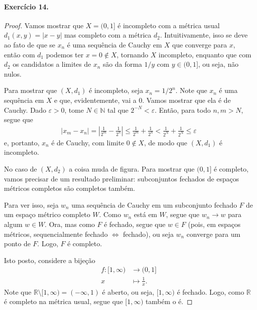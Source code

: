 \documentclass[12pt,a4paper]{article}
\begin{document}
\paragraph{Exercício 14.}
\begin{proof}
Vamos mostrar que $X = (0,1]$ é incompleto com a métrica usual $d_1(x,y) = |x-y|$ mas completo com a métrica $d_2$. Intuitivamente,
isso se deve ao fato de que se $x_n$ é uma sequência de Cauchy em $X$ que converge para $x$, então com $d_1$ podemos ter
$x=0\notin X$, tornando $X$ incompleto, enquanto que com $d_2$ os candidatos a limites de $x_n$ são da forma $1/y$ com $y\in (0,1]$, ou seja, não nulos.

Para mostrar que $(X, d_1)$ é incompleto, seja $x_n = 1/2^n$. Note que $x_n$ é uma sequência em $X$ e que, evidentemente, vai 
a $0$. Vamos mostrar que ela é de Cauchy. Dado $\varepsilon > 0$, tome $N\in\mathbb{N}$ tal que $2^{-N} < \varepsilon$. Então, para todo $n,m > N$, segue que
\begin{align*}
    |x_m - x_n| = \left| \frac{1}{2^m} - \frac{1}{2^n} \right| \leq \frac{1}{2^m} + \frac{1}{2^n} < \frac{1}{2^N} + \frac{1}{2^N} 
    \leq \varepsilon
\end{align*}
e, portanto, $x_n$ é de Cauchy, com limite $0\notin X$, de modo que $(X, d_1)$ é incompleto.

No caso de $(X, d_2)$ a coisa muda de figura. Para mostrar que $(0,1]$ é completo, vamos precisar de um resultado preliminar:
subconjuntos fechados de espaços métricos completos são completos também.

Para ver isso, seja $w_n$ uma sequência de Cauchy em um subconjunto fechado $F$ de um espaço métrico completo $W$. 
Como $w_n$ está em $W$, segue que $w_n \to w$ para algum $w\in W$. Ora, mas como $F$ é fechado, segue que $w\in F$
(pois, em espaços métricos, sequencialmente fechado $\iff$ fechado), ou seja $w_n$ converge para um ponto de $F$. 
Logo, $F$ é completo.

Isto posto, considere a bijeção
\begin{align*}
    f: [1, \infty) &\to (0,1]
    \\
    x&\mapsto \frac{1}{x}.
\end{align*}
Note que $\mathbb{R}\setminus [1, \infty) = (-\infty, 1)$ é aberto, ou seja, $[1, \infty)$ é fechado. Logo, como
$\mathbb{R}$ é completo na métrica usual, segue que $[1, \infty)$ também o é.
\end{proof}
\end{document}
